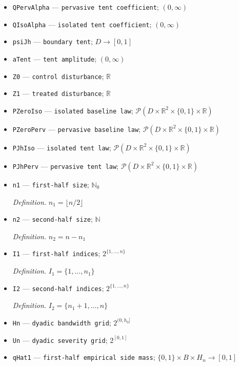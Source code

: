 \documentclass{article}
\begin{document}
\begin{itemize}
  \item \texttt{QPervAlpha} --- \texttt{pervasive tent coefficient}; \((0,\infty)\)
  \item \texttt{QIsoAlpha} --- \texttt{isolated tent coefficient}; \((0,\infty)\)
  \item \texttt{psiJh} --- \texttt{boundary tent}; \(D\to[0,1]\)
  \item \texttt{aTent} --- \texttt{tent amplitude}; \((0,\infty)\)
  \item \texttt{Z0} --- \texttt{control disturbance}; \(\mathbb R\)
  \item \texttt{Z1} --- \texttt{treated disturbance}; \(\mathbb R\)
  \item \texttt{PZeroIso} --- \texttt{isolated baseline law}; \(\mathcal P(D\times\mathbb R^2\times\{0,1\}\times\mathbb R)\)
  \item \texttt{PZeroPerv} --- \texttt{pervasive baseline law}; \(\mathcal P(D\times\mathbb R^2\times\{0,1\}\times\mathbb R)\)
  \item \texttt{PJhIso} --- \texttt{isolated tent law}; \(\mathcal P(D\times\mathbb R^2\times\{0,1\}\times\mathbb R)\)
  \item \texttt{PJhPerv} --- \texttt{pervasive tent law}; \(\mathcal P(D\times\mathbb R^2\times\{0,1\}\times\mathbb R)\)
  \item \texttt{n1} --- \texttt{first-\allowbreak{}half size}; \(\mathbb N_0\)
  \par\smallskip\noindent\emph{Definition.} \(n_1=\lfloor n/2\rfloor\)
  \item \texttt{n2} --- \texttt{second-\allowbreak{}half size}; \(\mathbb N\)
  \par\smallskip\noindent\emph{Definition.} \(n_2=n-n_1\)
  \item \texttt{I1} --- \texttt{first-\allowbreak{}half indices}; \(2^{\{1,\ldots,n\}}\)
  \par\smallskip\noindent\emph{Definition.} \(I_1=\{1,\ldots,n_1\}\)
  \item \texttt{I2} --- \texttt{second-\allowbreak{}half indices}; \(2^{\{1,\ldots,n\}}\)
  \par\smallskip\noindent\emph{Definition.} \(I_2=\{n_1+1,\ldots,n\}\)
  \item \texttt{Hn} --- \texttt{dyadic bandwidth grid}; \(2^{(0,h_0]}\)
  \item \texttt{Un} --- \texttt{dyadic severity grid}; \(2^{[0,1]}\)
  \item \texttt{qHat1} --- \texttt{first-\allowbreak{}half empirical side mass}; \(\{0,1\}\times B\times H_n\to[0,1]\)

\end{itemize}
\end{document}
